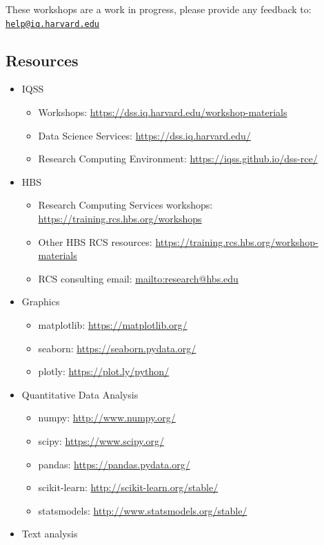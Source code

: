 \documentclass[
]{book}
\providecommand{\tightlist}{%
  \setlength{\itemsep}{0pt}\setlength{\parskip}{0pt}}
\begin{document}
These workshops are a work in progress, please provide any feedback to: \href{mailto:help@iq.harvard.edu}{\nolinkurl{help@iq.harvard.edu}}

\hypertarget{resources-7}{%
\subsection{Resources}\label{resources-7}}

\begin{itemize}
\tightlist
\item
  IQSS

  \begin{itemize}
  \tightlist
  \item
    Workshops: \url{https://dss.iq.harvard.edu/workshop-materials}
  \item
    Data Science Services: \url{https://dss.iq.harvard.edu/}
  \item
    Research Computing Environment: \url{https://iqss.github.io/dss-rce/}
  \end{itemize}
\item
  HBS

  \begin{itemize}
  \tightlist
  \item
    Research Computing Services workshops: \url{https://training.rcs.hbs.org/workshops}
  \item
    Other HBS RCS resources: \url{https://training.rcs.hbs.org/workshop-materials}
  \item
    RCS consulting email: \url{mailto:research@hbs.edu}
  \end{itemize}
\item
  Graphics

  \begin{itemize}
  \tightlist
  \item
    matplotlib: \url{https://matplotlib.org/}
  \item
    seaborn: \url{https://seaborn.pydata.org/}
  \item
    plotly: \url{https://plot.ly/python/}
  \end{itemize}
\item
  Quantitative Data Analysis

  \begin{itemize}
  \tightlist
  \item
    numpy: \url{http://www.numpy.org/}
  \item
    scipy: \url{https://www.scipy.org/}
  \item
    pandas: \url{https://pandas.pydata.org/}
  \item
    scikit-learn: \url{http://scikit-learn.org/stable/}
  \item
    statsmodels: \url{http://www.statsmodels.org/stable/}
  \end{itemize}
\item
  Text analysis


\end{itemize}
\end{document}
